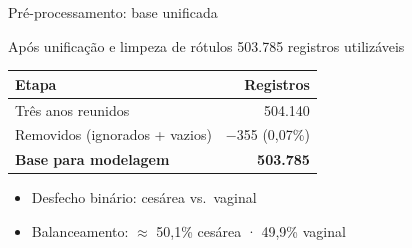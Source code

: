 \documentclass[aspectratio=169,xcolor=table]{beamer}
\begin{document}
\begin{frame}{Pré-processamento: base unificada}
    \begin{block}{Após unificação e limpeza de rótulos}
        \centering
        \Large 503.785 registros utilizáveis
    \end{block}

    \vspace{0.6em}
    \begin{table}
        \centering
        \begin{tabular}{lr}
            \toprule
            Etapa & Registros \\
            \midrule
            Três anos reunidos & 504.140 \\
            Removidos (ignorados + vazios) & $-$355 (0{,}07\%) \\
            \midrule
            \textbf{Base para modelagem} & \textbf{503.785} \\
            \bottomrule
        \end{tabular}
    \end{table}

    \vspace{0.4em}
    \begin{itemize}
        \item Desfecho binário: cesárea vs.\ vaginal
        \item Balanceamento: $\approx$ 50{,}1\% cesárea · 49{,}9\% vaginal
    \end{itemize}
\end{frame}
\end{document}
